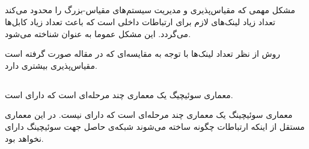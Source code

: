 \documentclass[paper=a4, fontsize=11pt]{article}
\numberwithin{equation}{section} %
\numberwithin{figure}{section} %
\numberwithin{table}{section} %
\begin{document}
\subsection{}
\par
مشکل مهمی که مقیاس‌پذیری و مدیریت سیستم‌های مقیاس-بزرگ را محدود می‌کند تعداد زیاد لینک‌های لازم برای ارتباطات داخلی است
که باعث تعداد زیاد کابل‌ها می‌گردد.
این مشکل عموما به عنوان
شناخته می‌شود.

\par
روش  از نظر تعداد لینک‌ها
با توجه به مقایسه‌ای که در مقاله صورت گرفته است مقیاس‌پذیری بیشتری دارد.

\subsection{}
\par
معماری سوئیچیگ 
یک معماری چند مرحله‌ای است که دارای 
است.
\par
معماری سوئیچینگ 
یک معماری چند مرحله‌ای است که دارای 
نیست.
در این معماری مستقل از اینکه ارتباطات چگونه ساخته می‌شوند شبکه‌ی حاصل جهت سوئیچینگ دارای
 نخواهد بود.
\end{document}
